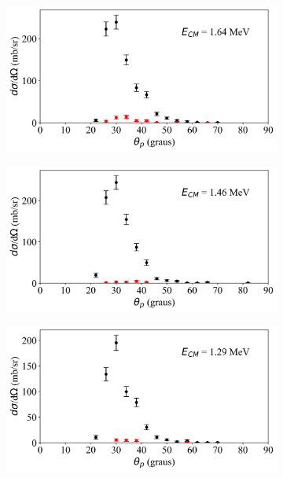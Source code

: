 \documentclass[a4paper,12pt,oneside]{book}
\begin{document}
\begin{figure}[H]
\centering
\ContinuedFloat
    \begin{subfigure}[b]{0.48\textwidth}
        \centering
        \includegraphics[scale=0.38, width=1.\columnwidth]{figs/dist_angs/dist_ang_22.png}
        \caption{}
        \label{subfig:dist_ang_w}
    \end{subfigure}%
    \hfill
    \begin{subfigure}[b]{0.48\textwidth}
        \centering
        \includegraphics[scale=0.38, width=1.\columnwidth]{figs/dist_angs/dist_ang_23.png}
        \caption{}
        \label{subfig:dist_ang_x}
    \end{subfigure}
    \begin{subfigure}[b]{0.48\textwidth}
        \centering
        \includegraphics[scale=0.38, width=1.\columnwidth]{figs/dist_angs/dist_ang_24.png}

\end{subfigure}
\end{figure}
\end{document}
